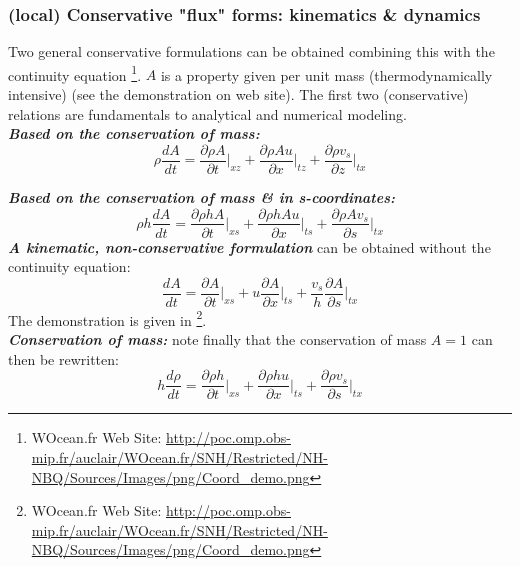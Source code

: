 \subsubsection{(local) Conservative "flux" forms: kinematics \& dynamics}
Two general conservative formulations can be obtained combining this with the continuity equation \citep{auclair_woceanfr_2011}\footnote{WOcean.fr Web Site: \url{http://poc.omp.obs-mip.fr/auclair/WOcean.fr/SNH/Restricted/NH-NBQ/Sources/Images/png/Coord_demo.png}}.
$A$ is a property given per unit mass (thermodynamically intensive) (see the demonstration on web site). The first two (conservative) relations are fundamentals to  analytical and numerical modeling.\\

\textbf{\textit{Based on the conservation of mass:}}
\begin{equation}
  \displaystyle 
  \rho \frac{d A}{dt}
  =\frac{\partial \rho A}{\partial t}\bigg\rvert_{xz}
  +\frac{\partial \rho A u}{\partial x}\bigg\rvert_{tz}
  +\frac{\partial \rho  v_s}{\partial z}\bigg\rvert_{tx}
\end{equation}

\textbf{\textit{Based on the conservation of mass \& in s-coordinates:}}
\begin{equation}
  \displaystyle 
  \rho h \frac{d A}{dt}
  =\frac{\partial \rho h A}{\partial t}\bigg\rvert_{xs}
  +\frac{\partial \rho h A u}{\partial x}\bigg\rvert_{ts}
  +\frac{\partial \rho  A v_s}{\partial s}\bigg\rvert_{tx}
\end{equation}
\textbf{\textit{A kinematic, non-conservative formulation}} can be obtained without the continuity equation:
\begin{equation}
\frac{d A}{d t} = \frac{\partial A}{\partial t} \bigg\rvert_{xs} + u \frac{\partial A}{\partial x} \bigg\rvert_{ts} + \frac{v_s}{h}\frac{\partial A}{\partial s}\bigg\rvert_{tx}
\end{equation}
The demonstration is given in \citep{auclair_woceanfr_2011}\footnote{WOcean.fr Web Site: \url{http://poc.omp.obs-mip.fr/auclair/WOcean.fr/SNH/Restricted/NH-NBQ/Sources/Images/png/Coord_demo.png}}.\\

\textbf{\textit{Conservation of mass:}}
note finally that the conservation of mass $A=1$ can then be rewritten:
\begin{equation}
  \displaystyle 
  \label{mass_s}
  h\frac{d\rho}{d t}
  =\frac{\partial \rho h }{\partial t}\bigg\rvert_{xs}
  +\frac{\partial \rho h u}{\partial x}\bigg\rvert_{ts}
  +\frac{\partial \rho  v_s}{\partial s}\bigg\rvert_{tx}
\end{equation}


